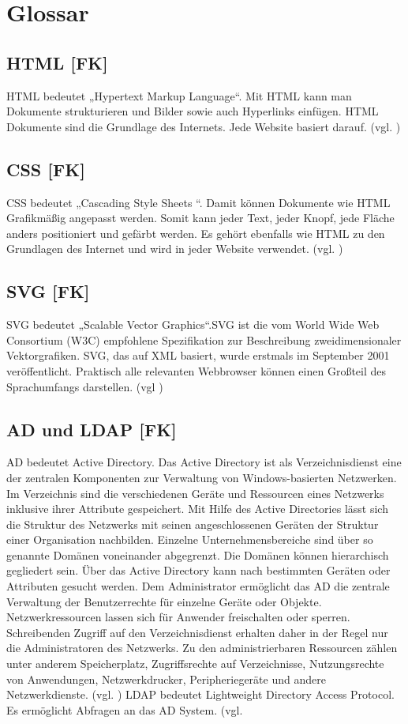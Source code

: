 \chapter{Glossar}
\section{HTML [FK]}\label{sec:HTML}
HTML bedeutet „Hypertext Markup Language“. Mit HTML kann man Dokumente strukturieren und Bilder sowie auch Hyperlinks einfügen. HTML Dokumente sind die Grundlage des Internets. Jede Website basiert darauf. (vgl. \cite{HTML})
\section{CSS [FK]}\label{sec:CSS}
CSS bedeutet „Cascading Style Sheets “. Damit können Dokumente wie HTML Grafikmäßig angepasst werden. Somit kann jeder Text, jeder Knopf, jede Fläche anders positioniert und gefärbt werden. Es gehört ebenfalls wie HTML zu den Grundlagen des Internet und wird in jeder Website verwendet. (vgl. \cite{CSS})
\section{SVG [FK]}\label{sec:SVG}
SVG bedeutet „Scalable Vector Graphics“.SVG ist die vom World Wide Web Consortium (W3C) empfohlene Spezifikation zur Beschreibung zweidimensionaler Vektorgrafiken. SVG, das auf XML basiert, wurde erstmals im September 2001 veröffentlicht. Praktisch alle relevanten Webbrowser können einen Großteil des Sprachumfangs darstellen. (vgl \cite{SVG})
\section{AD und LDAP [FK]}\label{sec:AD}
AD bedeutet Active Directory. Das Active Directory ist als Verzeichnisdienst eine der zentralen Komponenten zur Verwaltung von Windows-basierten Netzwerken. Im Verzeichnis sind die verschiedenen Geräte und Ressourcen eines Netzwerks inklusive ihrer Attribute gespeichert.
Mit Hilfe des Active Directories lässt sich die Struktur des Netzwerks mit seinen angeschlossenen Geräten der Struktur einer Organisation nachbilden. Einzelne Unternehmensbereiche sind über so genannte Domänen voneinander abgegrenzt.
Die Domänen können hierarchisch gegliedert sein. Über das Active Directory kann nach bestimmten Geräten oder Attributen gesucht werden. Dem Administrator ermöglicht das AD die zentrale Verwaltung der Benutzerrechte für einzelne Geräte oder Objekte. Netzwerkressourcen lassen sich für Anwender freischalten oder sperren. Schreibenden Zugriff auf den Verzeichnisdienst erhalten daher in der Regel nur die Administratoren des Netzwerks.
Zu den administrierbaren Ressourcen zählen unter anderem Speicherplatz, Zugriffsrechte auf Verzeichnisse, Nutzungsrechte von Anwendungen, Netzwerkdrucker, Peripheriegeräte und andere Netzwerkdienste. (vgl. \cite{AD})
LDAP bedeutet Lightweight Directory Access Protocol. Es ermöglicht Abfragen an das AD System. (vgl. \cite{LDAP}
